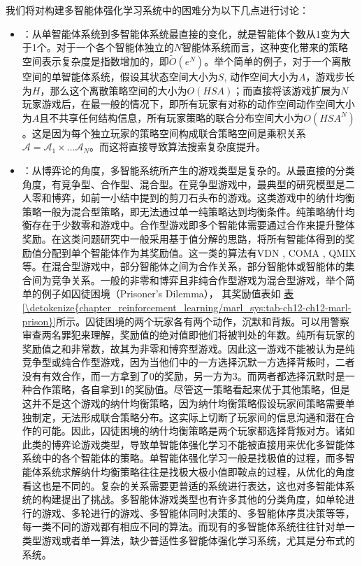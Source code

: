 \documentclass[letterpaper,10pt,english]{sphinxmanual}
\begin{document}
\sphinxAtStartPar
我们将对构建多智能体强化学习系统中的困难分为以下几点进行讨论：
\begin{itemize}
\item {} 
\sphinxAtStartPar
{}：从单智能体系统到多智能体系统最直接的变化，就是智能体个数从1变为大于1个。对于一个各个智能体独立的\(N\)智能体系统而言，这种变化带来的策略空间表示复杂度是指数增加的，即\(\tilde{O}(e^N)\)。举个简单的例子，对于一个离散空间的单智能体系统，假设其状态空间大小为\(S\),
动作空间大小为\(A\)，游戏步长为\(H\)，那么这个离散策略空间的大小为\(O(HSA)\)；而直接将该游戏扩展为\(N\)玩家游戏后，在最一般的情况下，即所有玩家有对称的动作空间动作空间大小为\(A\)且不共享任何结构信息，所有玩家策略的联合分布空间大小为\(O(HSA^N)\)。这是因为每个独立玩家的策略空间构成联合策略空间是乘积关系\(\mathcal{A}=\mathcal{A}_1\times\dots\mathcal{A}_N\)。而这将直接导致算法搜索复杂度提升。

\item {} 
\sphinxAtStartPar
{}：从博弈论的角度，多智能系统所产生的游戏类型是复杂的。从最直接的分类角度，有竞争型、合作型、混合型。在竞争型游戏中，最典型的研究模型是二人零和博弈，如前一小结中提到的剪刀\sphinxhyphen{}石头\sphinxhyphen{}布的游戏。这类游戏中的纳什均衡策略一般为混合型策略，即无法通过单一纯策略达到均衡条件。纯策略纳什均衡存在于少数零和游戏中。合作型游戏即多个智能体需要通过合作来提升整体奖励。在这类问题研究中一般采用基于值分解的思路，将所有智能体得到的奖励值分配到单个智能体作为其奖励值。这一类的算法有VDN
, COMA
, QMIX
等。在混合型游戏中，部分智能体之间为合作关系，部分智能体或智能体的集合间为竞争关系。一般的非零和博弈且非纯合作型游戏为混合型游戏，举个简单的例子如囚徒困境（Prisoner’s
Dilemma）， 其奖励值表如
\hyperref[\detokenize{chapter_reinforcement_learning/marl_sys:tab-ch12-ch12-marl-prison}]{表\ref{\detokenize{chapter_reinforcement_learning/marl_sys:tab-ch12-ch12-marl-prison}}}所示。囚徒困境的两个玩家各有两个动作，沉默和背叛。可以用警察审查两名罪犯来理解，奖励值的绝对值即他们将被判处的年数。纯所有玩家的奖励值之和非常数，故其为非零和博弈型游戏。因此这一游戏不能被认为是纯竞争型或纯合作型游戏，因为当他们中的一方选择沉默一方选择背叛时，二者没有有效合作，而一方拿到了0的奖励，另一方为\sphinxhyphen{}3。而两者都选择沉默时是一种合作策略，各自拿到\sphinxhyphen{}1的奖励值。尽管这一策略看起来优于其他策略，但是这并不是这个游戏的纳什均衡策略，因为纳什均衡策略假设玩家间策略需要单独制定，无法形成联合策略分布。这实际上切断了玩家间的信息沟通和潜在合作的可能。因此，囚徒困境的纳什均衡策略是两个玩家都选择背叛对方。诸如此类的博弈论游戏类型，导致单智能体强化学习不能被直接用来优化多智能体系统中的各个智能体的策略。单智能体强化学习一般是找极值的过程，而多智能体系统求解纳什均衡策略往往是找极大\sphinxhyphen{}极小值即鞍点的过程，从优化的角度看这也是不同的。复杂的关系需要更普适的系统进行表达，这也对多智能体系统的构建提出了挑战。多智能体游戏类型也有许多其他的分类角度，如单轮进行的游戏、多轮进行的游戏、多智能体同时决策的、多智能体序贯决策等等，每一类不同的游戏都有相应不同的算法。而现有的多智能体系统往往针对单一类型游戏或者单一算法，缺少普适性多智能体强化学习系统，尤其是分布式的系统。


\end{itemize}
\end{document}
